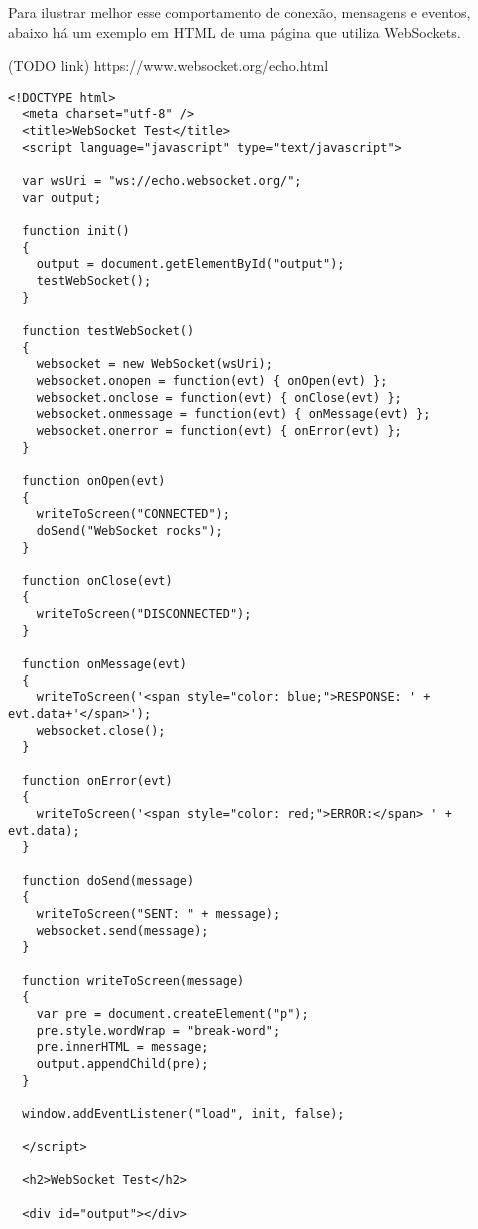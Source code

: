 \documentclass[a4paper,12pt]{article}
\begin{document}



Para ilustrar melhor esse comportamento de conexão, mensagens e eventos, abaixo há um exemplo em HTML de uma página que utiliza WebSockets.

(TODO link)
https://www.websocket.org/echo.html

\begin{small}
\begin{Verbatim}[frame=single]
  <!DOCTYPE html>
  <meta charset="utf-8" />
  <title>WebSocket Test</title>
  <script language="javascript" type="text/javascript">

  var wsUri = "ws://echo.websocket.org/";
  var output;

  function init()
  {
    output = document.getElementById("output");
    testWebSocket();
  }

  function testWebSocket()
  {
    websocket = new WebSocket(wsUri);
    websocket.onopen = function(evt) { onOpen(evt) };
    websocket.onclose = function(evt) { onClose(evt) };
    websocket.onmessage = function(evt) { onMessage(evt) };
    websocket.onerror = function(evt) { onError(evt) };
  }

  function onOpen(evt)
  {
    writeToScreen("CONNECTED");
    doSend("WebSocket rocks");
  }

  function onClose(evt)
  {
    writeToScreen("DISCONNECTED");
  }

  function onMessage(evt)
  {
    writeToScreen('<span style="color: blue;">RESPONSE: ' + evt.data+'</span>');
    websocket.close();
  }

  function onError(evt)
  {
    writeToScreen('<span style="color: red;">ERROR:</span> ' + evt.data);
  }

  function doSend(message)
  {
    writeToScreen("SENT: " + message);
    websocket.send(message);
  }

  function writeToScreen(message)
  {
    var pre = document.createElement("p");
    pre.style.wordWrap = "break-word";
    pre.innerHTML = message;
    output.appendChild(pre);
  }

  window.addEventListener("load", init, false);

  </script>

  <h2>WebSocket Test</h2>

  <div id="output"></div>

\end{Verbatim}
\end{small}
\end{document}
